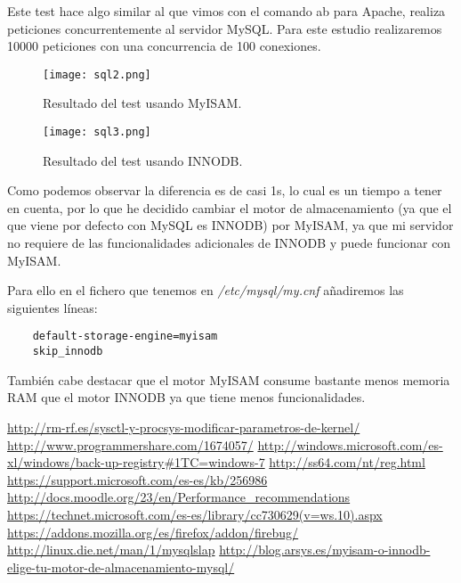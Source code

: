 \documentclass[a4paper, 10pt]{article} %
\begin{document}
Este test hace algo similar al que vimos con el comando ab para Apache, realiza peticiones concurrentemente al servidor MySQL. Para este estudio realizaremos 10000 peticiones con una concurrencia de 100 conexiones.

\begin{figure}[H]
\centering 
\texttt{[image: sql2.png]} 
\caption{Resultado del test usando MyISAM.} 
\label{contexto:figura} 
\end{figure} 

\begin{figure}[H]
\centering 
\texttt{[image: sql3.png]} 
\caption{Resultado del test usando INNODB.} 
\label{contexto:figura} 
\end{figure} 

Como podemos observar la diferencia es de casi 1s, lo cual es un tiempo a tener en cuenta, por lo que he decidido cambiar el motor de almacenamiento (ya que el que viene por defecto con MySQL es INNODB) por MyISAM, ya que mi servidor no requiere de las funcionalidades adicionales de INNODB y puede funcionar con MyISAM.

Para ello en el fichero que tenemos en \textit{/etc/mysql/my.cnf} añadiremos las siguientes líneas\cite{10}:

\begin{verbatim}
    default-storage-engine=myisam
    skip_innodb
\end{verbatim}
También cabe destacar que el motor MyISAM consume bastante menos memoria RAM que el motor INNODB ya que tiene menos funcionalidades.

\pagebreak

\begin{thebibliography}{99}
 \url{http://rm-rf.es/sysctl-y-procsys-modificar-parametros-de-kernel/}
 \url{http://www.programmershare.com/1674057/}
 \url{http://windows.microsoft.com/es-xl/windows/back-up-registry#1TC=windows-7}
 \url{http://ss64.com/nt/reg.html}
 \url{https://support.microsoft.com/es-es/kb/256986}
 \url{http://docs.moodle.org/23/en/Performance_recommendations}
 \url{https://technet.microsoft.com/es-es/library/cc730629(v=ws.10).aspx}
 \url{https://addons.mozilla.org/es/firefox/addon/firebug/}
 \url{http://linux.die.net/man/1/mysqlslap}
 \url{http://blog.arsys.es/myisam-o-innodb-elige-tu-motor-de-almacenamiento-mysql/}
\end{thebibliography}
\end{document}
